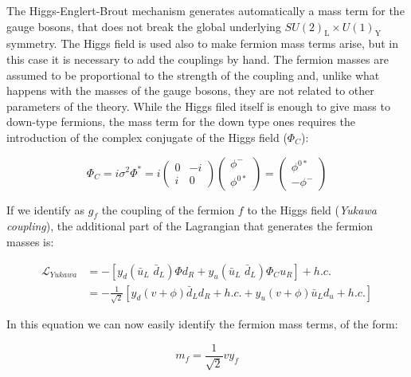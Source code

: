 The Higgs-Englert-Brout mechanism generates automatically a mass term for the gauge bosons, that does not break the global underlying $SU(2)_\mathrm{L} \times U(1)_\mathrm{Y}$ symmetry. The Higgs field is used also to make fermion mass terms arise, but in this case it is necessary to add the couplings by hand. The fermion masses are assumed to be proportional to the strength of the coupling and, unlike what happens with the masses of the gauge bosons, they are not related to other parameters of the theory. While the Higgs filed itself is enough to give mass to down-type fermions, the mass term for the down type ones requires the introduction of the complex conjugate of the Higgs field ($\Phi_C$):

\begin{equation}
 \Phi_C = i \sigma^2 \Phi^* 
	= i \left( \begin{array}{cc} 0 & -i \\ i & 0 \end{array} \right) 
	\left( \begin{array}{c} \phi^- \\ \phi^{0*} \end{array} \right)
	= \left( \begin{array}{c} \phi^{0*} \\ - \phi^- \end{array} \right)
\end{equation}

If we identify as $g_f$ the coupling of the fermion $f$ to the Higgs field (\textit{Yukawa coupling}), the additional part of the Lagrangian that generates the fermion masses is:

\begin{equation}
\begin{aligned}
\mathcal{L}_{Yukawa} &= - \left[  y_d \left( \bar{u}_L \,\, \bar{d}_L  \right) \Phi d_R +  y_u \left( \bar{u}_L \,\, \bar{d}_L  \right) \Phi_C u_R \right] + h.c. \\
&= - \frac{1}{\sqrt{2}} \left[  y_d \left( v + \phi \right) \bar{d}_L d_R + h.c. + y_u \left( v + \phi \right) \bar{u}_L d_u + h.c. \right] 
\end{aligned}
\end{equation}

\noindent In this equation we can now easily identify the fermion mass terms, of the form:

\begin{equation}
m_f =  \frac{1}{\sqrt{2}} v y_f
\end{equation}

